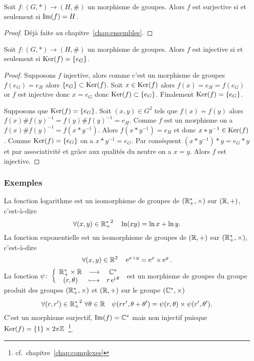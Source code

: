 \begin{prop}
  Soit \(f:(G,*) \longrightarrow (H,\#)\) un morphisme de groupes. Alors \(f\) 
  est surjective si et seulement si \(\operatorname{Im}(f)=H\).
\end{prop}
\begin{proof}
  Déjà faite au chapitre~\ref{chap:ensembles}.
\end{proof}
\begin{prop}
  Soit \(f:(G,*) \longrightarrow (H,\#)\) un morphisme de groupes. Alors \(f\) 
  est injective si et seulement si \(\operatorname{Ker}(f)=\{e_G\}\).
\end{prop}
\begin{proof}
  Supposons \(f\) injective, alors comme c'est un morphisme de groupes 
  \(f(e_G)=e_H\) alors \(\{e_G\} \subset \operatorname{Ker}(f)\). Soit \(x \in \operatorname{Ker}(f)\) alors 
  \(f(x)=e_H=f(e_G)\) or \(f\) est injective donc \(x=e_G\) donc \(\operatorname{Ker}(f) 
  \subset \{e_G\}\). Finalement \(\operatorname{Ker}(f)=\{e_G\}\).

  Supposons que \(\operatorname{Ker}(f)=\{e_G\}\). Soit \((x,y) \in G^2\) tels que 
  \(f(x)=f(y)\) alors \(f(x)\#f(y)^{-1}=f(y)\#f(y)^{-1} = e_H\). Comme \(f\) est 
  un morphisme on a \(f(x)\#f(y)^{-1} = f(x*y^{-1})\). Alors \(f(x*y^{-1}) = 
  e_H\) et donc \(x*y^{-1} \in \operatorname{Ker}(f)\). Comme \(\operatorname{Ker}(f)=\{e_G\}\) on a 
  \(x*y^{-1} = e_G\). Par conséquent \((x*y^{-1})*y = e_G*y\) et par 
  associativité et grâce aux qualités du neutre on a \(x=y\). Alors \(f\) est 
  injective.
\end{proof}

\subsubsection{Exemples}

La fonction logarithme est un isomorphisme de groupes de \((\mathbb{R}^{*}_+,\times)\) 
sur \((\mathbb{R},+)\), c'est-à-dire
\begin{equation}
  \forall (x,y) \in {\mathbb{R}_{+}^{*}}^2 \quad \ln(xy) = \ln x + \ln y.
\end{equation}
La fonction exponentielle est un isomorphisme de groupes de \((\mathbb{R},+)\) sur 
\((\mathbb{R}^{*}_+,\times)\), c'est-à-dire
\begin{equation}
  \forall (x,y) \in \mathbb{R}^2 \quad \operatorname{e}^{x+y} = \operatorname{e}^x \times \operatorname{e}^y.
\end{equation}
La fonction \(\psi\colon\left\{\begin{array}{ccc}\mathbb{R}_{+}^{*} \times 
\mathbb{R} & \longrightarrow &\mathbb{C}^{*}\\(r,\theta) & \longmapsto & r\operatorname{e}^{\operatorname{i} \theta}\end{array}\right.\) est un morphisme de groupes du 
groupe produit des groupes \((\mathbb{R}_{+}^{*},\times)\) et \((\mathbb{R},+)\) sur le groupe 
\((\mathbb{C}^{*},\times)\)
\begin{equation}
  \forall (r,r') \in {\mathbb{R}_{+}^{*}}^2 \ \forall \theta \in \mathbb{R} \quad 
  \psi(rr',\theta+\theta')=\psi(r,\theta) \times \psi(r',\theta').
\end{equation}
C'est un morphisme surjectif, \(\operatorname{Im}(f)=\mathbb{C}^{*}\) mais non injectif puisque 
\(\operatorname{Ker}(f)=\{1\}\times 2\pi \mathbb{Z}\)~\footnote{cf.\ chapitre~\ref{chap:complexes}}.

